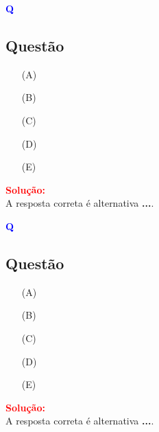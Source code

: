 \begin{flushleft}
\textbf{\textcolor{blue}{\Large Q}}\\
\noindent

\subsection{Quest\~ao }

\begin{itemize}
\item[(A)] 
\item[(B)] 
\item[(C)] 
\item[(D)] 
\item[(E)] 
\end{itemize}

\vspace{0.5cm}

\textcolor{red}{\textbf{Solução:}}\\

A resposta correta é alternativa \colorbox{green!50}{\textbf{...}}.
\end{flushleft}


\begin{flushleft}
\textbf{\textcolor{blue}{\Large Q}}\\
\noindent

\subsection{Quest\~ao }

\begin{itemize}
\item[(A)] 
\item[(B)] 
\item[(C)] 
\item[(D)] 
\item[(E)] 
\end{itemize}

\vspace{0.5cm}

\textcolor{red}{\textbf{Solução:}}\\

A resposta correta é alternativa \colorbox{green!50}{\textbf{...}}.
\end{flushleft}
